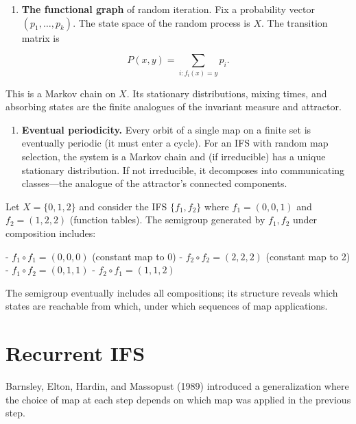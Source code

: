 \begin{enumerate}
\item \textbf{The functional graph} of random iteration. Fix a probability vector $(p_1, \ldots, p_k)$. The state space of the random process is $X$. The transition matrix is
\end{enumerate}

\[P(x, y) = \sum_{i : f_i(x) = y} p_i.\]

This is a Markov chain on $X$. Its stationary distributions, mixing times, and absorbing states are the finite analogues of the invariant measure and attractor.

\begin{enumerate}
\item \textbf{Eventual periodicity.} Every orbit of a single map on a finite set is eventually periodic (it must enter a cycle). For an IFS with random map selection, the system is a Markov chain and (if irreducible) has a unique stationary distribution. If not irreducible, it decomposes into communicating classes—the analogue of the attractor's connected components.
\end{enumerate}

\begin{example}
Let $X = \{ 0, 1, 2\} $ and consider the IFS $\{ f_1, f_2\} $ where $f_1 = (0, 0, 1)$ and $f_2 = (1, 2, 2)$ (function tables). The semigroup generated by $f_1, f_2$ under composition includes:

- $f_1 \circ f_1 = (0, 0, 0)$ (constant map to 0)
- $f_2 \circ f_2 = (2, 2, 2)$ (constant map to 2)
- $f_1 \circ f_2 = (0, 1, 1)$
- $f_2 \circ f_1 = (1, 1, 2)$

The semigroup eventually includes all compositions; its structure reveals which states are reachable from which, under which sequences of map applications.
\end{example}

\section{Recurrent IFS}

Barnsley, Elton, Hardin, and Massopust (1989) introduced a generalization where the choice of map at each step depends on which map was applied in the previous step.

